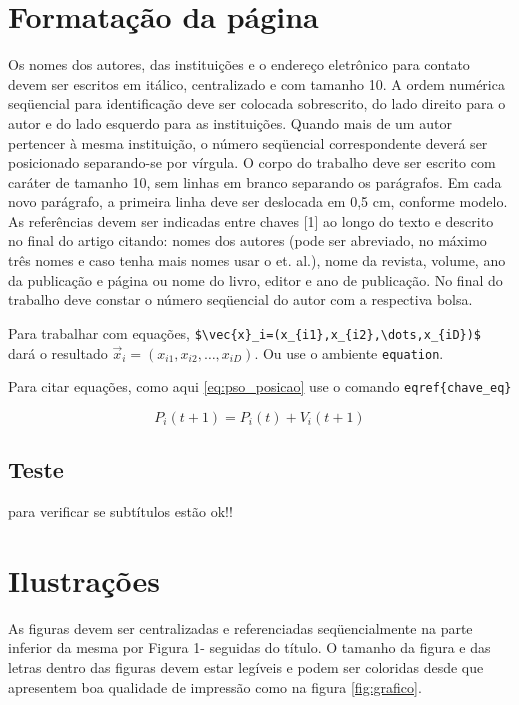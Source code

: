 \documentclass[a4paper,10pt,twocolumn,fleqn]{article}
\begin{document}
    \section{Formatação da página}\label{sec:formatacao}
    Os nomes dos autores, das instituições e o endereço eletrônico para contato devem ser escritos em itálico, centralizado e com tamanho 10. A ordem numérica seqüencial para identificação deve ser colocada sobrescrito, do lado direito para o autor e do lado esquerdo para as instituições. Quando mais de um autor pertencer à mesma instituição, o número seqüencial correspondente deverá ser posicionado separando-se por vírgula.
    O corpo do trabalho deve ser escrito com caráter de tamanho 10, sem linhas em branco separando os parágrafos. Em cada novo parágrafo, a primeira linha deve ser deslocada em 0,5 cm, conforme modelo. As referências devem ser indicadas entre chaves [1] ao longo do texto e descrito no final do artigo citando: nomes dos autores (pode ser abreviado, no máximo três nomes e caso tenha mais nomes usar o et. al.), nome da revista, volume, ano da publicação e página ou nome do livro, editor e ano de publicação. No final do trabalho deve constar o número seqüencial do autor com a respectiva bolsa.
    
    Para trabalhar com equações, \verb|$\vec{x}_i=(x_{i1},x_{i2},\dots,x_{iD})$| dará
    o resultado $\vec{x}_i=(x_{i1},x_{i2},\dots,x_{iD})$. Ou use o ambiente \verb|equation|.
    
    
    Para citar equações, como aqui \eqref{eq:pso_posicao} use o comando \verb|eqref{chave_eq}|
    
    
    \begin{equation} \label{eq:pso_posicao}
    P_i(t+1)=P_i(t) +V_i(t+1)
    \end{equation}
    
    \subsection{Teste}
    para verificar se subtítulos estão ok!!
    

    \section{Ilustrações}\label{sec:ilustracoes}
    As figuras devem ser centralizadas e referenciadas seqüencialmente na parte inferior da mesma por Figura 1- seguidas do título. O tamanho da figura e das letras dentro das figuras devem estar legíveis e podem ser coloridas desde que apresentem boa qualidade de impressão como na figura \ref{fig:grafico}.
    
\end{document}

